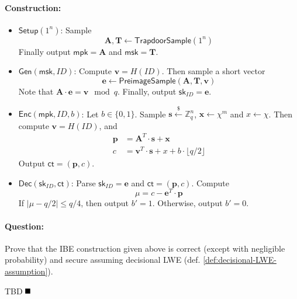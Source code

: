 \documentclass[11pt]{article}
\newenvironment{solution}{\color{blue}\noindent{\bf Solution}\hspace*{1em}}{\qed\medskip}
\newcommand{\qed}{\mbox{}\hspace*{\fill}\nolinebreak\mbox{$\rule{0.6em}{0.6em}$}} %
\numberwithin{equation}{section}
\newcommand{\bfe}{\mathbf{e}}
\newcommand{\bfp}{\mathbf{p}}
\newcommand{\bfs}{\mathbf{s}}
\newcommand{\bfv}{\mathbf{v}}
\newcommand{\bfx}{\mathbf{x}}
\newcommand{\bfA}{\mathbf{A}}
\newcommand{\bfT}{\mathbf{T}}
\newcommand{\bbZ}{\mathbb{Z}}
\newcommand{\Setup}{\mathsf{Setup}}
\newcommand{\Gen}{\mathsf{Gen}}
\newcommand{\Enc}{\mathsf{Enc}}
\newcommand{\Dec}{\mathsf{Dec}}
\newcommand{\sk}{\mathsf{sk}}
\newcommand{\mpk}{\mathsf{mpk}}
\newcommand{\msk}{\mathsf{msk}}
\newcommand{\ct}{\mathsf{ct}}
\newcommand{\getsr}{\stackrel{\$}{\gets}}
\newcommand{\bin}{\{0,1\}}
\newcommand{\bit}{\bin}
\begin{document}
\paragraph{Construction:}
\begin{itemize}
    \item $\Setup(1^n)$: Sample 
    \[\bfA, \bfT \gets \mathsf{TrapdoorSample}(1^n)\]
    Finally output $\mpk = \bfA$ and $\msk = \bfT$.
    \item $\Gen(\msk, ID)$: Compute $\bfv = H(ID)$. Then sample a short vector
    \[\bfe \gets \mathsf{PreimageSample}(\bfA, \bfT, \bfv)\]
    Note that $\bfA \cdot \bfe = \bfv \mod q$. Finally, output $\sk_{ID} = \bfe$.
    \item $\Enc(\mpk, ID, b)$: Let $b \in \bit$. Sample $\bfs \getsr \bbZ_q^n$, $\bfx \gets \chi^m$ and $x \gets \chi$. Then compute $\bfv = H(ID)$, and 
    \begin{align*}
        \bfp &= \bfA^T \cdot \bfs + \bfx\\
        c &= \bfv^T \cdot \bfs + x + b \cdot \lfloor q/2 \rfloor
    \end{align*}
    Output $\ct = (\bfp, c)$.
    \item $\Dec(\sk_{ID}, \ct)$: Parse $\sk_{ID} = \bfe$ and $\ct = (\bfp, c)$. Compute
    \[\mu = c - \bfe^T \cdot \bfp\]
    If $|\mu - q/2| \leq q/4$, then output $b'=1$. Otherwise, output $b' = 0$.
\end{itemize}

\paragraph{Question:} Prove that the IBE construction given above is correct (except with negligible probability) and secure assuming decisional LWE (def. \ref{def:decisional-LWE-assumption}).

\vspace{5mm}
\begin{solution}
TBD
\end{solution}
\end{document}
